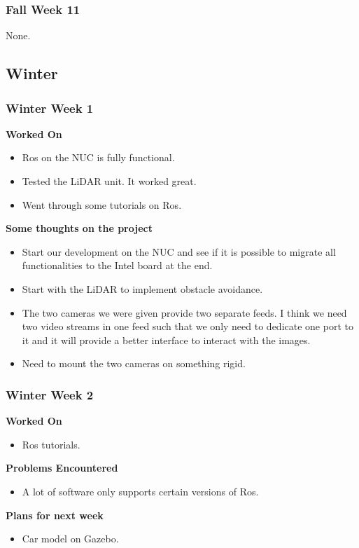 \documentclass[compsoc,draftclsnofoot,onecolumn,10pt]{IEEEtran}
\begin{document}
\subsubsection*{Fall Week 11}
None.



\subsection{Winter}

\subsubsection*{Winter Week 1}
\textbf{Worked On}
\begin{itemize}
  \item Ros on the NUC is fully functional.
  \item Tested the LiDAR unit. It worked great.
  \item Went through some tutorials on Ros.
\end{itemize}
\textbf{Some thoughts on the project}
\begin{itemize}
  \item Start our development on the NUC and see if it is possible to
  migrate all functionalities to the Intel board at the end.
  \item Start with the LiDAR to implement obstacle avoidance.
  \item The two cameras we were given provide two separate feeds. I
  think we need two video streams in one feed such that we only need to
  dedicate one port to it and it will provide a better interface to
  interact with the images.
  \item Need to mount the two cameras on something rigid.
\end{itemize}


\subsubsection*{Winter Week 2}
\textbf{Worked On}
\begin{itemize}
  \item Ros tutorials.
\end{itemize}
\textbf{Problems Encountered}
\begin{itemize}
  \item A lot of software only supports certain versions of Ros.
\end{itemize}
\textbf{Plans for next week}
\begin{itemize}
  \item Car model on Gazebo.
\end{itemize}
\end{document}
